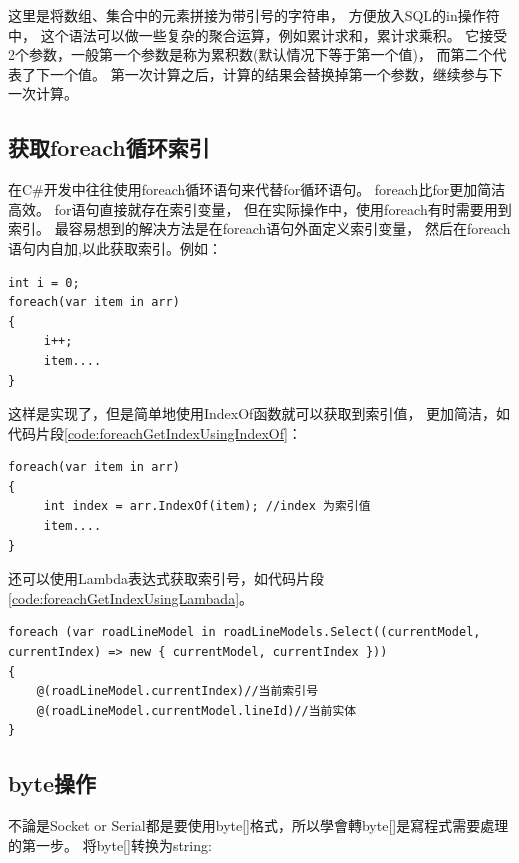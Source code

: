 \documentclass{book}
\begin{document}
这里是将数组、集合中的元素拼接为带引号的字符串，
方便放入SQL的in操作符中，
这个语法可以做一些复杂的聚合运算，例如累计求和，累计求乘积。
它接受2个参数，一般第一个参数是称为累积数(默认情况下等于第一个值)，
而第二个代表了下一个值。
第一次计算之后，计算的结果会替换掉第一个参数，继续参与下一次计算。

\subsection{获取foreach循环索引}

在C\#开发中往往使用foreach循环语句来代替for循环语句。
foreach比for更加简洁高效。
for语句直接就存在索引变量，
但在实际操作中，使用foreach有时需要用到索引。
最容易想到的解决方法是在foreach语句外面定义索引变量，
然后在foreach语句内自加,以此获取索引。例如：

\begin{lstlisting}[language={[Sharp]C},caption=foreach获取当前索引号,label={code:foreachGetIndex}]
int i = 0;
foreach(var item in arr)
{
     i++;
     item....
}
\end{lstlisting}


这样是实现了，但是简单地使用IndexOf函数就可以获取到索引值，
更加简洁，如代码片段\ref{code:foreachGetIndexUsingIndexOf}：

\begin{lstlisting}[language={[Sharp]C},caption=foreach获取当前索引号,label={code:foreachGetIndexUsingIndexOf}]
foreach(var item in arr)
{
     int index = arr.IndexOf(item); //index 为索引值
     item....
}
\end{lstlisting}

还可以使用Lambda表达式获取索引号，如代码片段\ref{code:foreachGetIndexUsingLambada}。

\begin{lstlisting}[language={[Sharp]C},caption=foreach获取当前索引号,label={code:foreachGetIndexUsingLambada}]
foreach (var roadLineModel in roadLineModels.Select((currentModel, currentIndex) => new { currentModel, currentIndex }))
{
    @(roadLineModel.currentIndex)//当前索引号
    @(roadLineModel.currentModel.lineId)//当前实体              
}
\end{lstlisting}


\subsection{byte操作}

不論是Socket or Serial都是要使用byte[]格式，所以學會轉byte[]是寫程式需要處理的第一步。
将byte[]转换为string:
\end{document}
